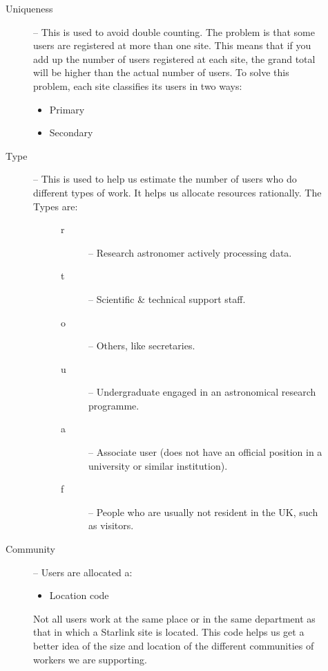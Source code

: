 {\begin{description}
\item[\mbox{}]\mbox{}
\begin{description}
\item [Uniqueness] --
 This is used to avoid double counting.
 The problem is that some users are registered at more than one site.
 This means that if you add up the number of users registered at each site,
 the grand total will be higher than the actual number of users.
 To solve this problem, each site classifies its users in two ways:
 \begin{itemize}
 \item Primary
 \item Secondary
 \end{itemize}
\item [Type] --
 This is used to help us estimate the number of users who do different types
 of work.
 It helps us allocate resources rationally.
 The Types are:
 \begin{description}
\item[\mbox{}]\mbox{}
 \begin{description}
 \item [r] -- Research astronomer actively processing data.
 \item [t] -- Scientific \& technical support staff.
 \item [o] -- Others, like secretaries.
 \item [u] -- Undergraduate engaged in an astronomical research programme.
 \item [a] -- Associate user (does not have an official position in a
              university or similar institution).
 \item [f] -- People who are usually not resident in the UK, such as visitors.
 \end{description}
 \end{description}
\item [Community] --
 Users are allocated a:
 \begin{itemize}
 \item Location code
 \end{itemize}
 Not all users work at the same place or in the same department as that in
 which a Starlink site is located.
 This code helps us get a better idea of the size and location of the different
 communities of workers we are supporting.
\end{description}
\end{description}

}
